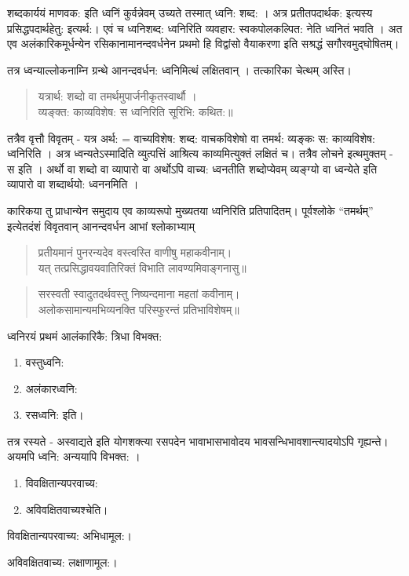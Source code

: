 शब्दकार्ययं माणवक: इति ध्वनिं कुर्वन्नेवम् उच्यते तस्मात् ध्वनि: शब्द: । अत्र प्रतीतपदार्थक: इत्यस्य प्रसिद्धपदार्थहेतु: इत्यर्थ:। एवं च ध्वनिशब्द: ध्वनिरिति व्यवहार: स्वकपोलकल्पित: नेति ध्वनितं भवति । अत एव अलंकारिकमूर्धन्येन रसिकानामानन्दवर्धनेन प्रथमो हि विद्वांसो वैयाकरणा इति सश्रद्धं सगौरवमुद्घोषितम्।

तत्र ध्वन्याल्लोकनाम्नि ग्रन्थे आनन्दवर्धन: ध्वनिमित्थं लक्षितवान् । तत्कारिका चेत्थम् अस्ति।
\begin{verse}
यत्रार्थ: शब्दो वा तमर्थमुपार्जनीकृतस्वार्थौ ।\\
व्यङ्क्त: काव्यविशेष: स ध्वनिरिति सूरिभि: कथित:॥
\end{verse}
तत्रैव वृत्तौ विवृतम् - यत्र अर्थ: = वाच्यविशेष: शब्द: वाचकविशेषो वा तमर्थ: व्यङ्कः स: काव्यविशेष: ध्वनिरिति । अत्र ध्वन्यतेऽस्मादिति व्युत्पत्तिं आश्रित्य काव्यमित्युक्तं लक्षितं च। तत्रैव लोचने इत्थमुक्तम् - स इति । अर्थो वा शब्दो वा व्यापारो वा अर्थोऽपि वाच्य: ध्वनतीति शब्दोप्येवम् व्यङ्ग्यो वा ध्वन्येते इति व्यापारो वा शब्दार्थयो: ध्वननमिति ।

कारिकया तु प्राधान्येन समुदाय एव काव्यरूपो मुख्यतया ध्वनिरिति प्रतिपादितम्। पूर्वश्लोके “तमर्थम्” इत्येतदंशं विवृतवान् आनन्दवर्धन आभां श्लोकाभ्याम् 
\begin{verse}
प्रतीयमानं पुनरन्यदेव वस्त्वस्ति वाणीषु महाकवीनाम्।\\
यत् तत्प्रसिद्धावयवातिरिक्तं विभाति लावण्यमिवाङ्गनासु॥
\end{verse}
\begin{verse}
सरस्वती स्वादुतदर्थवस्तु निष्यन्दमाना महतां कवीनाम्।\\
अलोकसामान्यमभिव्यनक्ति परिस्फुरन्तं प्रतिभाविशेषम्॥
\end{verse}
ध्वनिरयं प्रथमं आलंकारिकै: त्रिधा विभक्त:
\begin{enumerate}
\item वस्तुध्वनि:
\item अलंकारध्वनि:
\item रसध्वनि: इति।
\end{enumerate}

तत्र रस्यते - अस्वाद्यते इति योगशक्त्या रसपदेन भावाभासभावोदय भावसन्धिभावशान्त्यादयोऽपि गृह्यन्ते। अयमपि ध्वनि: अन्ययापि विभक्त: ।
\begin{enumerate}
\item विवक्षितान्यपरवाच्य:
\item अविवक्षितवाच्यश्चेति।
\end{enumerate}
विवक्षितान्यपरवाच्य: अभिधामूल:।

अविवक्षितवाच्य: लक्षाणामूल:।

